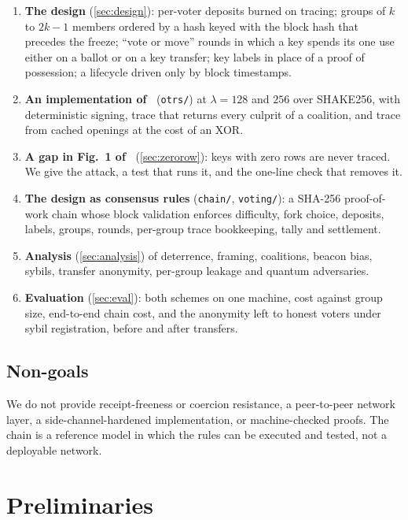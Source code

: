 \documentclass[11pt,a4paper]{article}
\theoremstyle{definition}
\begin{document}
\begin{enumerate}[leftmargin=*]
\item \textbf{The design} (\cref{sec:design}): per-voter deposits burned
      on tracing; groups of $k$ to $2k-1$ members ordered by a hash keyed
      with the block hash that precedes the freeze; ``vote or move''
      rounds in which a key spends its one use either on a ballot or on
      a key transfer; key labels in place of a proof of possession; a
      lifecycle driven only by block timestamps.
\item \textbf{An implementation of~\cite{SZ21}} (\texttt{otrs/}) at
      $\lambda = 128$ and $256$ over SHAKE256, with deterministic signing,
      trace that returns every culprit of a coalition, and trace from
      cached openings at the cost of an XOR.
\item \textbf{A gap in Fig.~1 of~\cite{SZ21}} (\cref{sec:zerorow}): keys
      with zero rows are never traced. We give the attack, a test that
      runs it, and the one-line check that removes it.
\item \textbf{The design as consensus rules} (\texttt{chain/},
      \texttt{voting/}): a SHA-256 proof-of-work chain whose block
      validation enforces difficulty, fork choice, deposits, labels,
      groups, rounds, per-group trace bookkeeping, tally and settlement.
\item \textbf{Analysis} (\cref{sec:analysis}) of deterrence, framing,
      coalitions, beacon bias, sybils, transfer anonymity, per-group
      leakage and quantum adversaries.
\item \textbf{Evaluation} (\cref{sec:eval}): both schemes on one machine,
      cost against group size, end-to-end chain cost, and the anonymity
      left to honest voters under sybil registration, before and after
      transfers.
\end{enumerate}

\subsection{Non-goals}

We do not provide receipt-freeness or coercion resistance, a
peer-to-peer network layer, a side-channel-hardened implementation, or
machine-checked proofs. The chain is a reference model in which the
rules can be executed and tested, not a deployable network.

\section{Preliminaries}
\end{document}
